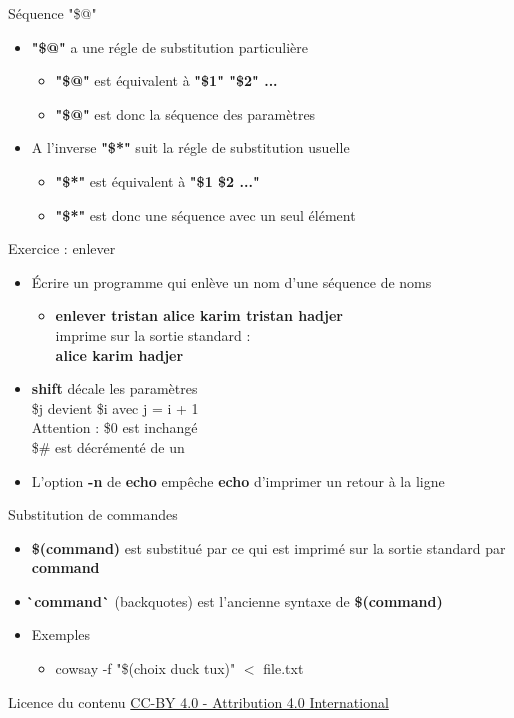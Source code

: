 \documentclass[xcolor=table]{beamer}
\begin{document}
\begin{frame}{Séquence "\$@"}
\begin{itemize}
    \item \textbf{"\$@"} a une régle de substitution particulière
    \begin{itemize}
        \item \textbf{"\$@"} est équivalent à \textbf{"\$1" "\$2" ...}
        \item \textbf{"\$@"} est donc la séquence des paramètres
    \end{itemize}
    \item A l'inverse \textbf{"\$*"} suit la régle de substitution usuelle
    \begin{itemize}
        \item \textbf{"\$*"} est équivalent à \textbf{"\$1 \$2 ..."}
        \item \textbf{"\$*"} est donc une séquence avec un seul élément
    \end{itemize}
\end{itemize}
\end{frame}

\begin{frame}{Exercice : enlever}
\begin{itemize}
    \item Écrire un programme qui enlève un nom d'une séquence de noms
    \begin{itemize}
        \item \textbf{enlever tristan alice karim tristan hadjer}\\
        imprime sur la sortie standard :\\
        \textbf{alice karim hadjer}
    \end{itemize}
    \item \textbf{shift} décale les paramètres\\
    \$j devient \$i avec j = i + 1\\
    Attention : \$0 est inchangé\\
    \$\# est décrémenté de un
    \item L'option \textbf{-n} de \textbf{echo} empêche \textbf{echo} d'imprimer un retour à la ligne
\end{itemize}
\end{frame}

\begin{frame}{Substitution de commandes}
\begin{itemize}
    \item \textbf{\$(command)} est substitué par ce qui est imprimé sur la sortie standard par \textbf{command}
    \item \textbf{\`\,command\`} (backquotes) est l'ancienne syntaxe de \textbf{\$(command)}
    \item Exemples
    \begin{itemize}
        \item cowsay -f "\$(choix duck tux)" $<$ file.txt
    \end{itemize}
\end{itemize}
\end{frame}

\begin{frame}{Licence du contenu}
\href{https://creativecommons.org/licenses/by/4.0/}{CC-BY 4.0 - Attribution 4.0 International}
\end{frame}
\end{document}
